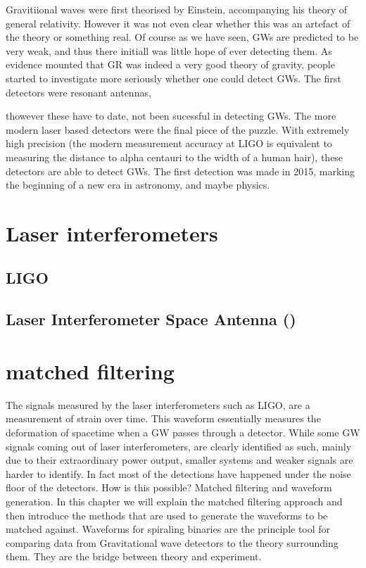 \documentclass[
  letterpaper,
  DIV=11,
  numbers=noendperiod,
  oneside]{scrreprt}
\begin{document}
Gravitiional waves were first theorised by Einstein, accompanying his
theory of general relativity. However it was not even clear whether this
was an artefact of the theory or something real. Of course as we have
seen, {GW}s are predicted to be very weak, and thus there initiall was
little hope of ever detecting them. As evidence mounted that {GR} was
indeed a very good theory of gravity, people started to investigate more
seriously whether one could detect {GW}s. The first detectors were
resonant antennas,

thowever these have to date, not been sucessful in detecting {GW}s. The
more modern laser based detectors were the final piece of the puzzle.
With extremely high precision (the modern measurement accuracy at {LIGO}
is equivalent to measuring the distance to alpha centauri to the width
of a human hair), these detectors are able to detect {GW}s. The first
detection was made in 2015, marking the beginning of a new era in
astronomy, and maybe physics.

\hypertarget{laser-interferometers}{%
\section{Laser interferometers}\label{laser-interferometers}}

\hypertarget{sec-ligo}{%
\subsection{\texorpdfstring{{LIGO}}{LIGO}}\label{sec-ligo}}

\hypertarget{section}{%
\subsection{Laser Interferometer Space Antenna ()}\label{section}}

\hypertarget{matched-filtering}{%
\section{matched filtering}\label{matched-filtering}}

The signals measured by the laser interferometers such as {LIGO}, are a
measurement of strain over time. This waveform essentially measures the
deformation of spacetime when a {GW} passes through a detector. While
some {GW} signals coming out of laser interferometers, are clearly
identified as such, mainly due to their extraordinary power output,
smaller systems and weaker signals are harder to identify. In fact most
of the detections have happened under the noise floor of the detectors.
How is this possible? Matched filtering and waveform generation. In this
chapter we will explain the matched filtering approach and then
introduce the methods that are used to generate the waveforms to be
matched against. Waveforms for spiraling binaries are the principle tool
for comparing data from Gravitational wave detectors to the theory
surrounding them. They are the bridge between theory and experiment.
\end{document}
